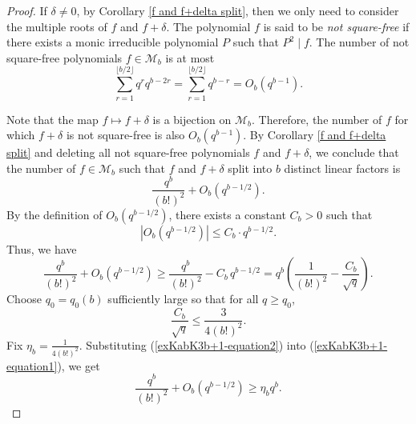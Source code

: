 \documentclass[11pt,a4paper]{article}
\theoremstyle{definition}
\theoremstyle{remark}
\begin{document}
\begin{proof}


If $\delta\neq0$, by Corollary \ref{f and f+delta split}, then we only need to consider the multiple roots of $f$ and $f+\delta$.
The polynomial $f$ is said to be \emph{not square-free} if there exists a monic irreducible  polynomial $P$ such that $P^2 \mid f$. The number of not square-free polynomials $f\in \mathcal{M}_b$ is at most
\[
\sum_{r=1}^{\lfloor b/2 \rfloor}q^rq^{b-2r}=\sum_{r=1}^{\lfloor b/2 \rfloor}q^{b-r}=O_b(q^{b-1}).
\]

Note that the map $f \mapsto f+\delta$ is a bijection on $\mathcal{M}_b$.
Therefore, the number of $f$ for which $f+\delta$ is not square-free is also $O_b(q^{b-1})$.
By Corollary \ref{f and f+delta split} and deleting all not square-free polynomials $f$ and $f+\delta$, we conclude that  the number of $f \in \mathcal{M}_b$ such that $f$ and $f+\delta$ split into $b$ distinct linear factors is 
$$\frac{q^b}{(b!)^2} + O_b\left(q^{b-1/2}\right).$$
By the definition of $O_b\left(q^{b-1/2}\right)$, there exists a constant $C_b > 0$ such that
$$\left| O_b\left(q^{b-1/2}\right) \right| \leq C_b \cdot q^{b-1/2}.$$
Thus, we have
\begin{equation}\label{exKabK3b+1-equation1}
\frac{q^b}{(b!)^2} + O_b\left(q^{b-1/2}\right) \geq \frac{q^b}{(b!)^2} - C_b \, q^{b-1/2} = q^b \left( \frac{1}{(b!)^2} - \frac{C_b}{\sqrt{q}} \right).
\end{equation}
Choose $q_0 = q_0(b)$ sufficiently large so that for all $q \geq q_0$,
\begin{equation}\label{exKabK3b+1-equation2}
\frac{C_b}{\sqrt{q}} \leq \frac{3}{4(b!)^2}.
\end{equation}
Fix $\eta_b=\frac{1}{4(b!)^2}$.  Substituting (\ref{exKabK3b+1-equation2}) into (\ref{exKabK3b+1-equation1}), we get
$$\frac{q^b}{(b!)^2} + O_b\left(q^{b-1/2}\right) \geq \eta_bq^b.$$ 


\end{proof}
\end{document}

